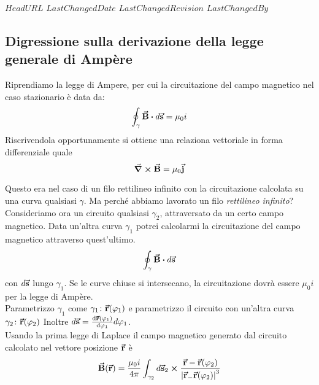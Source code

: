 \svnidlong
{$HeadURL$}
{$LastChangedDate$}
{$LastChangedRevision$}
{$LastChangedBy$}

\subsection{Digressione sulla derivazione della legge generale di Ampère}
Riprendiamo la legge di Ampere, per cui la circuitazione del campo magnetico nel caso stazionario è data da:
\begin{equation*}
	\oint_\gamma \vba B\vdot d\vba s = \mu_0 i	
\end{equation*}
Riscrivendola opportunamente
si ottiene una relaziona vettoriale in forma differenziale quale
\begin{equation*}
	\grad\cross\vb*{\va{B}}= \mu_0 \vb*{\va{j}}
\end{equation*}

Questo era nel caso di un filo rettilineo infinito con la circuitazione calcolata su una curva qualsiasi $\gamma$. Ma perché abbiamo lavorato un filo \textit{rettilineo infinito}?\\
Consideriamo ora un circuito qualsiasi $\gamma_2$, attraversato da un certo campo magnetico.
Data un'altra curva $\gamma_1$ potrei calcolarmi la circuitazione del campo magnetico attraverso quest'ultimo.
\begin{equation*}
	\oint_\gamma \vba B\vdot d\vba s
\end{equation*}
con $d\vb*{\va{s}}$ lungo $\gamma_1$. Se le curve chiuse si intersecano, la circuitazione dovrà essere $\mu_0 i$ per la legge di Ampère.\\
Parametrizzo $\gamma_1$ come $\gamma_1 \colon \vb*{\va{r}}(\varphi_1)$ e parametrizzo il circuito con un'altra curva $\gamma_2 \colon \vb*{\va{r}}(\varphi_2)$ Inoltre $d\vb*{\va{s}}= \dv{\vb*{\va{r}} (\varphi_1)}{\varphi_1} d\varphi_1$.\\
Usando la prima legge di Laplace il campo magnetico generato dal circuito calcolato nel vettore posizione $\vb*{\va{r}}$ è
\begin{equation*}
	\vb*{\va{B}} (\vb*{\va{r}})=\frac{\mu_0 i}{4\pi}\int_{\gamma_2} d\vb*{\va{s}}_2 \cross \frac{\vb*{\va{r}} - \vb*{\va{r}} (\varphi_2)}{\abs{\vb*{\va{r}}_ - \vb*{\va{r}} (\varphi_2)}^3}
\end{equation*}

